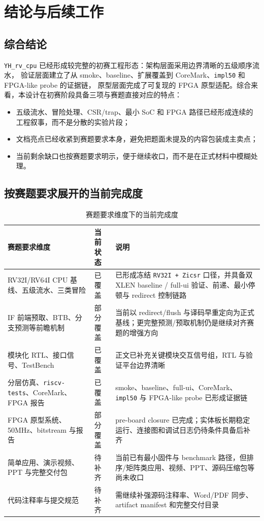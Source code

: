\section{结论与后续工作}

\subsection{综合结论}

\texttt{YH\_rv\_cpu} 已经形成较完整的初赛工程形态：架构层面采用边界清晰的五级顺序流水，
验证层面建立了从 smoke、baseline、扩展覆盖到 CoreMark、\texttt{impl50} 和 FPGA-like probe 的证据链，
原型层面完成了可复现的 FPGA 原型适配。综合来看，本设计在初赛阶段具备三项与赛题直接对应的特点：
\begin{itemize}
    \item 五级流水、冒险处理、CSR/trap、最小 SoC 和 FPGA 路径已经形成连续的工程叙事，而不是分散的实验片段；
    \item 文档亮点已经收紧到赛题要求本身，避免把题面未提及的内容包装成主卖点；
    \item 当前剩余缺口也按赛题要求明示，便于继续收口，而不是在正式材料中模糊处理。
\end{itemize}

\subsection{按赛题要求展开的当前完成度}

\begin{table}[H]
    \centering
    \small
    \caption{赛题要求维度下的当前完成度}
    \begin{tabularx}{0.95\textwidth}{L{0.24\textwidth} L{0.15\textwidth} Y}
        \toprule
        赛题要求维度 & 当前状态 & 说明 \\
        \midrule
        RV32I/RV64I CPU 基线、五级流水、三类冒险 & 已覆盖 & 已形成冻结 \texttt{RV32I + Zicsr} 口径，并具备双 XLEN baseline / full-ui 验证、前递、最小停顿与 redirect 控制链路 \\
        IF 前端预取、BTB、分支预测等前瞻机制 & 部分覆盖 & 当前以 redirect/flush 与译码早重定向为正式基线；更完整预测/预取机制仍是继续对齐赛题的增强方向 \\
        模块化 RTL、接口信号、TestBench & 已覆盖 & 正文已补充关键模块交互信号组，RTL 与验证平台边界清晰 \\
        分层仿真、\texttt{riscv-tests}、CoreMark、FPGA 报告 & 已覆盖 & smoke、baseline、full-ui、CoreMark、\texttt{impl50} 与 FPGA-like probe 已形成证据链 \\
        FPGA 原型系统、50MHz、bitstream 与报告 & 部分覆盖 & pre-board closure 已完成；实体板长期稳定运行、连接图和调试日志仍待条件具备后补齐 \\
        简单应用、演示视频、PPT 与完整交付包 & 待补齐 & 当前已有最小固件与 benchmark 路径，但排序/矩阵类应用、视频、PPT、源码压缩包等尚未收口 \\
        代码注释率与提交规范 & 待补齐 & 需继续补强源码注释率、Word/PDF 同步、artifact manifest 和完整交付目录 \\
        \bottomrule
    \end{tabularx}
\end{table}

